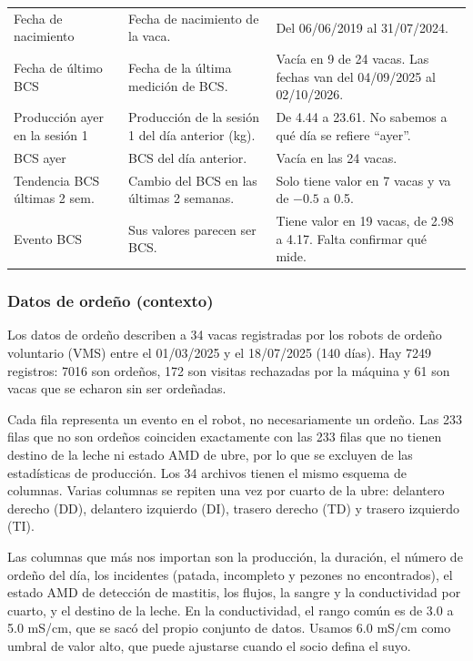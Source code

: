 \begin{table}[H]
\begin{tabularx}{\textwidth}{>{\raggedright\arraybackslash}p{}>{\raggedright\arraybackslash}X>{\raggedright\arraybackslash}X}
    Fecha de nacimiento & Fecha de nacimiento de la vaca. & Del 06/06/2019 al 31/07/2024. \\
    \addlinespace
    Fecha de último BCS & Fecha de la última medición de BCS. & Vacía en 9 de 24 vacas. Las fechas van del 04/09/2025 al 02/10/2026. \\
    \addlinespace
    Producción ayer en la sesión 1 & Producción de la sesión 1 del día anterior (kg). & De 4.44 a 23.61. No sabemos a qué día se refiere ``ayer''. \\
    \addlinespace
    BCS ayer & BCS del día anterior. & Vacía en las 24 vacas. \\
    \addlinespace
    Tendencia BCS últimas 2 sem. & Cambio del BCS en las últimas 2 semanas. & Solo tiene valor en 7 vacas y va de $-0.5$ a 0.5. \\
    \addlinespace
    Evento BCS & Sus valores parecen ser BCS. & Tiene valor en 19 vacas, de 2.98 a 4.17. Falta confirmar qué mide. \\
    \bottomrule
  \end{tabularx}
\end{table}

\subsubsection*{Datos de ordeño (contexto)}

Los datos de ordeño describen a 34 vacas registradas por los robots de ordeño voluntario (VMS) entre el 01/03/2025 y el 18/07/2025 (140 días). Hay 7249 registros: 7016 son ordeños, 172 son visitas rechazadas por la máquina y 61 son vacas que se echaron sin ser ordeñadas.

Cada fila representa un evento en el robot, no necesariamente un ordeño. Las 233 filas que no son ordeños coinciden exactamente con las 233 filas que no tienen destino de la leche ni estado AMD de ubre, por lo que se excluyen de las estadísticas de producción. Los 34 archivos tienen el mismo esquema de columnas. Varias columnas se repiten una vez por cuarto de la ubre: delantero derecho (DD), delantero izquierdo (DI), trasero derecho (TD) y trasero izquierdo (TI).

Las columnas que más nos importan son la producción, la duración, el número de ordeño del día, los incidentes (patada, incompleto y pezones no encontrados), el estado AMD de detección de mastitis, los flujos, la sangre y la conductividad por cuarto, y el destino de la leche. En la conductividad, el rango común es de 3.0 a 5.0 mS/cm, que se sacó del propio conjunto de datos. Usamos 6.0 mS/cm como umbral de valor alto, que puede ajustarse cuando el socio defina el suyo.
